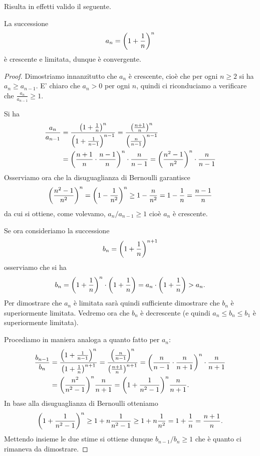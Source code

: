 Risulta in effetti valido il seguente.

\begin{theorem}
\mymark{**}
La successione
\[
  a_n = {\left( 1+\frac 1 n \right)}^n
\]
è crescente e limitata, dunque è convergente.
\end{theorem}
%
\begin{proof}
Dimostriamo innanzitutto che $a_n$ è crescente, cioè che
per ogni $n\ge 2$ si ha $a_n \ge a_{n-1}$.
E' chiaro che $a_n>0$ per ogni $n$,
quindi ci riconduciamo a
verificare che $\frac{a_n}{a_{n-1}} \ge 1$.

Si ha
\begin{align*}
\frac{a_n}{a_{n-1}}
&= \frac{{\left( 1+\frac 1 n \right)}^n}{{\left( 1+\frac 1 {n-1} \right)}^{n-1}}
= \frac{{\left( \frac{n+1}{n} \right)}^n}{{\left( \frac{n}{n-1} \right)}^{n-1}}\\
&= {\left( \frac{n+1}{n}\cdot\frac{n-1}{n} \right)}^n \cdot \frac{n}{n-1}
= {\left( \frac{n^2- 1}{n^2} \right)}^n \cdot \frac{n}{n-1}
\end{align*}
Osserviamo ora che la disuguaglianza di Bernoulli garantisce
\[
  {\left( \frac{n^2 -1}{n^2} \right)}^n
  = {\left( 1-\frac{1}{n^2} \right)}^n
  \ge 1 - \frac{n}{n^2} = 1 - \frac{1}{n} = \frac{n-1}{n}
\]
da cui si ottiene, come volevamo, $a_n / a_{n-1} \ge 1$ cioè
$a_n$ è crescente.

Se ora consideriamo la successione
\[
  b_n = {\left( 1+\frac 1 n \right)}^{n+1}
\]
osserviamo che si ha
\[
  b_n = {\left( 1+\frac 1 n \right)}^n \cdot {\left( 1+\frac 1 n \right)}
   = a_n\cdot {\left( 1+\frac 1 n \right)} > a_n.
\]
Per dimostrare che $a_n$ è limitata sarà quindi sufficiente dimostrare
che $b_n$ è superiormente limitata. Vedremo ora che $b_n$ è decrescente (e quindi $a_n \le b_n \le b_1$ è superiormente limitata).

Procediamo in maniera analoga a quanto fatto per $a_n$:
\begin{align*}
\frac{b_{n-1}}{b_n}
& = \frac{{\left( 1+\frac{1}{n-1} \right)}^n}{{\left( 1+\frac{1}{n} \right)}^{n+1}}
  = \frac{{\left( \frac{n}{n-1} \right)}^n}{{\left( \frac{n+1}{n} \right)}^{n+1}}
  = {\left( \frac{n}{n-1}\cdot\frac{n}{n+1} \right)}^n\cdot\frac{n}{n+1} \\
& = {\left( \frac{n^2}{n^2-1} \right)}^n \frac{n}{n+1}
  = {\left( 1 + \frac{1}{n^2-1} \right)}^n \frac{n}{n+1}.
\end{align*}
In base alla disuguaglianza di Bernoulli otteniamo
\[
  {\left( 1 + \frac{1}{n^2-1} \right)}^n
  \ge 1 + n \frac{1}{n^2-1}
  \ge 1 + n\frac{1}{n^2}  = 1+\frac{1}{n} = \frac{n+1}{n}.
\]
Mettendo insieme le due stime si ottiene dunque $b_{n-1}/b_n \ge 1$
che è quanto ci rimaneva da dimostrare.
\end{proof}

